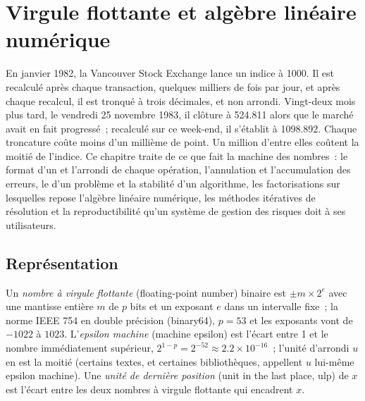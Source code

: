 \chapter{Virgule flottante et algèbre linéaire numérique}\label{ch:qm:floating-point-and-numerical-linear-algebra}

En janvier 1982, la Vancouver Stock Exchange lance un indice à 1000. Il est recalculé après chaque transaction, quelques milliers de fois par jour,
et après chaque recalcul, il est tronqué à trois décimales, et non arrondi. Vingt-deux mois plus tard, le vendredi 25 novembre 1983, il clôture
à 524.811 alors que le marché avait en fait progressé~; recalculé sur ce week-end, il s'établit à 1098.892. Chaque troncature coûte moins
d'un millième de point. Un million d'entre elles coûtent la moitié de l'indice. Ce chapitre traite de ce que fait la machine des nombres~: le format
d'un  et l'arrondi de chaque opération, l'annulation et l'accumulation des erreurs, le  d'un problème et la
stabilité d'un algorithme, les factorisations sur lesquelles repose l'algèbre linéaire numérique, les méthodes itératives de résolution et la reproductibilité
qu'un système de gestion des risques doit à ses utilisateurs.

\section{Représentation}

\begin{definition}\label{def:qm:floating-point-and-numerical-linear-algebra:fp}
Un \emph{nombre à virgule flottante} (floating-point number) binaire est $\pm m \times 2^e$ avec une mantisse entière $m$ de $p$ bits et un exposant $e$ dans un intervalle fixe~; la norme IEEE 754
en double précision (binary64), $p = 53$ et les exposants vont de $-1022$ à $1023$. L'\emph{epsilon machine} (machine epsilon) est l'écart entre 1 et le nombre immédiatement supérieur, $2^{1-p} =
2^{-52} \approx 2.2 \times 10^{-16}$~; l'unité d'arrondi $u$ en est la moitié (certains textes, et certaines bibliothèques, appellent $u$ lui-même epsilon machine). Une \emph{unité de dernière position} (unit in the last place, ulp) de $x$ est l'écart entre les deux
nombres à virgule flottante qui encadrent $x$.
\end{definition}

